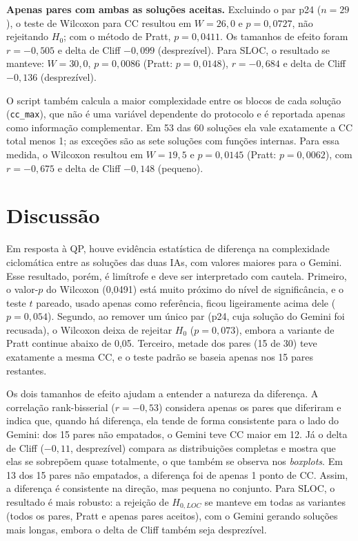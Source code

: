 \documentclass[12pt]{article}
\begin{document}
\textbf{Apenas pares com ambas as soluções aceitas.} Excluindo o par p24 ($n = 29$), o teste de
Wilcoxon para CC resultou em $W = 26{,}0$ e $p = 0{,}0727$, não rejeitando $H_0$; com o método
de Pratt, $p = 0{,}0411$. Os tamanhos de efeito foram $r = -0{,}505$ e delta de Cliff $-0{,}099$
(desprezível). Para SLOC, o resultado se manteve: $W = 30{,}0$, $p = 0{,}0086$ (Pratt:
$p = 0{,}0148$), $r = -0{,}684$ e delta de Cliff $-0{,}136$ (desprezível).

O script também calcula a maior complexidade entre os blocos de cada solução (\texttt{cc\_max}),
que não é uma variável dependente do protocolo e é reportada apenas como informação complementar.
Em 53 das 60 soluções ela vale exatamente a CC total menos 1; as exceções são as sete soluções com
funções internas. Para essa medida, o Wilcoxon resultou em $W = 19{,}5$ e $p = 0{,}0145$ (Pratt:
$p = 0{,}0062$), com $r = -0{,}675$ e delta de Cliff $-0{,}148$ (pequeno).

\section{Discussão}
Em resposta à QP, houve evidência estatística de diferença na complexidade ciclomática entre as
soluções das duas IAs, com valores maiores para o Gemini. Esse resultado, porém, é limítrofe e
deve ser interpretado com cautela. Primeiro, o valor-$p$ do Wilcoxon (0,0491) está muito próximo
do nível de significância, e o teste $t$ pareado, usado apenas como referência, ficou ligeiramente
acima dele ($p = 0{,}054$). Segundo, ao remover um único par (p24, cuja solução do Gemini foi
recusada), o Wilcoxon deixa de rejeitar $H_0$ ($p = 0{,}073$), embora a variante de Pratt continue
abaixo de 0,05. Terceiro, metade dos pares (15 de 30) teve exatamente a mesma CC, e o teste
padrão se baseia apenas nos 15 pares restantes.

Os dois tamanhos de efeito ajudam a entender a natureza da diferença. A correlação rank-bisserial
($r = -0{,}53$) considera apenas os pares que diferiram e indica que, quando há diferença, ela
tende de forma consistente para o lado do Gemini: dos 15 pares não empatados, o Gemini teve CC
maior em 12. Já o delta de Cliff ($-0{,}11$, desprezível) compara as distribuições completas e
mostra que elas se sobrepõem quase totalmente, o que também se observa nos \emph{boxplots}. Em 13
dos 15 pares não empatados, a diferença foi de apenas 1 ponto de CC. Assim, a diferença é
consistente na direção, mas pequena no conjunto. Para SLOC, o resultado é mais robusto: a
rejeição de $H_{0,LOC}$ se manteve em todas as variantes (todos os pares, Pratt e apenas pares
aceitos), com o Gemini gerando soluções mais longas, embora o delta de Cliff também seja
desprezível.
\end{document}
